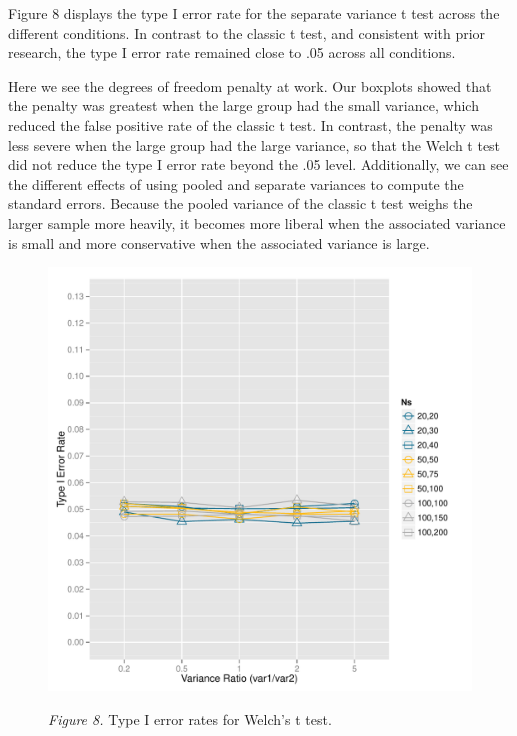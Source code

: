 \documentclass[man,a4paper,noextraspace,apacite]{apa6}\usepackage[]{graphicx}\usepackage[]{color}
\makeatletter
\def\maxwidth{ %
  \ifdim\Gin@nat@width>\linewidth
    \linewidth
  \else
    \Gin@nat@width
  \fi
}
\newenvironment{knitrout}{}{} %
\makeatother
\begin{document}
    Figure 8 displays the type I error rate for the separate variance t test across the different conditions. In contrast to the classic t test, and consistent with prior research, the type I error rate remained close to .05 across all conditions. 
    
    Here we see the degrees of freedom penalty at work. Our boxplots showed that the penalty was greatest when the large group had the small variance, which reduced the false positive rate of the classic t test. In contrast, the penalty was less severe when the large group had the large variance, so that the Welch t test did not reduce the type I error rate beyond the .05 level. Additionally, we can see the different effects of using pooled and separate variances to compute the standard errors. Because the pooled variance of the classic t test weighs the larger sample more heavily, it becomes more liberal when the associated variance is small and more conservative when the associated variance is large. 

\begin{figure}
\begin{knitrout}
\color{fgcolor}
\includegraphics[width=\maxwidth]{figure/type1_Welch_plot} 

\end{knitrout}
\textit{Figure 8.} Type I error rates for Welch's t test.
\end{figure}
\end{document}
